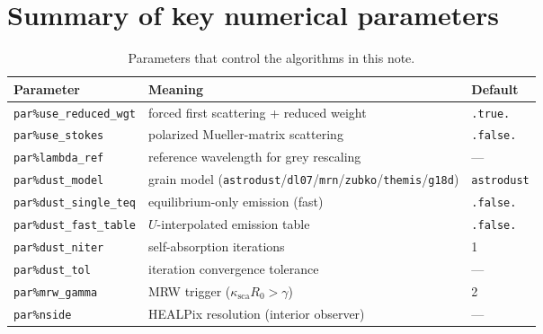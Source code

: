 \documentclass[english,a4paper]{kiseon_memo}
\newcommand{\ksca}{\kappa_{\mathrm{sca}}}
\newcommand{\code}[1]{\texttt{#1}}
\newcommand{\pp}[1]{\texttt{par\%#1}}
\begin{document}
\section{Summary of key numerical parameters}
\begin{table}[htb]
\centering
\caption{Parameters that control the algorithms in this note.}
\begin{tabular}{lll}
\toprule
Parameter & Meaning & Default \\
\midrule
\pp{use\_reduced\_wgt}  & forced first scattering + reduced weight & \code{.true.}\\
\pp{use\_stokes}        & polarized Mueller-matrix scattering      & \code{.false.}\\
\pp{lambda\_ref}        & reference wavelength for grey rescaling  & --- \\
\pp{dust\_model}   & grain model (\code{astrodust}/\code{dl07}/\code{mrn}/\code{zubko}/\code{themis}/\code{g18d}) & \code{astrodust}\\
\pp{dust\_single\_teq}  & equilibrium-only emission (fast)         & \code{.false.}\\
\pp{dust\_fast\_table}  & $U$-interpolated emission table          & \code{.false.}\\
\pp{dust\_niter}        & self-absorption iterations               & 1 \\
\pp{dust\_tol}          & iteration convergence tolerance          & --- \\
\pp{mrw\_gamma}         & MRW trigger ($\ksca R_0>\gamma$)         & 2 \\
\pp{nside}              & HEALPix resolution (interior observer)   & --- \\
\bottomrule
\end{tabular}
\end{table}

\end{document}
